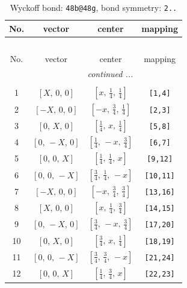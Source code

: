 \documentclass[fleqn,8pt]{jsarticle}
\begin{document}
\renewcommand{\arraystretch}{1.2}
\begin{longtable}{cccc}
\caption{Wyckoff bond: {\tt 48b@48g}, bond symmetry: {\tt 2..}}
 \\
 \hline \hline
No. & vector & center & mapping \\ \hline \endfirsthead

\multicolumn{3}{l}{\tablename\ \thetable{}} \\
 \hline \hline
No. & vector & center & mapping \\ \hline \endhead

 \hline \hline
\multicolumn{3}{r}{\footnotesize\it continued ...} \\ \endfoot

 \hline \hline
\multicolumn{3}{r}{} \\ \endlastfoot

1 & $\left[ X,\, 0,\, 0 \right]$ & $\left[ x,\, \frac{1}{4},\, \frac{1}{4} \right]$ & {\tt [1,4]} \\ \hline
2 & $\left[ - X,\, 0,\, 0 \right]$ & $\left[ - x,\, \frac{3}{4},\, \frac{1}{4} \right]$ & {\tt [2,3]} \\ \hline
3 & $\left[ 0,\, X,\, 0 \right]$ & $\left[ \frac{1}{4},\, x,\, \frac{1}{4} \right]$ & {\tt [5,8]} \\ \hline
4 & $\left[ 0,\, - X,\, 0 \right]$ & $\left[ \frac{1}{4},\, - x,\, \frac{3}{4} \right]$ & {\tt [6,7]} \\ \hline
5 & $\left[ 0,\, 0,\, X \right]$ & $\left[ \frac{1}{4},\, \frac{1}{4},\, x \right]$ & {\tt [9,12]} \\ \hline
6 & $\left[ 0,\, 0,\, - X \right]$ & $\left[ \frac{3}{4},\, \frac{1}{4},\, - x \right]$ & {\tt [10,11]} \\ \hline
7 & $\left[ - X,\, 0,\, 0 \right]$ & $\left[ - x,\, \frac{3}{4},\, \frac{3}{4} \right]$ & {\tt [13,16]} \\ \hline
8 & $\left[ X,\, 0,\, 0 \right]$ & $\left[ x,\, \frac{1}{4},\, \frac{3}{4} \right]$ & {\tt [14,15]} \\ \hline
9 & $\left[ 0,\, - X,\, 0 \right]$ & $\left[ \frac{3}{4},\, - x,\, \frac{3}{4} \right]$ & {\tt [17,20]} \\ \hline
10 & $\left[ 0,\, X,\, 0 \right]$ & $\left[ \frac{3}{4},\, x,\, \frac{1}{4} \right]$ & {\tt [18,19]} \\ \hline
11 & $\left[ 0,\, 0,\, - X \right]$ & $\left[ \frac{3}{4},\, \frac{3}{4},\, - x \right]$ & {\tt [21,24]} \\ \hline
12 & $\left[ 0,\, 0,\, X \right]$ & $\left[ \frac{1}{4},\, \frac{3}{4},\, x \right]$ & {\tt [22,23]} \\
\end{longtable}
\end{document}
